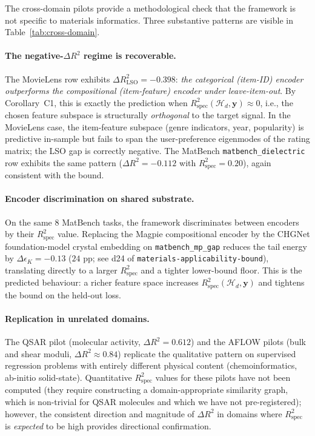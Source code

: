 \documentclass[11pt,a4paper]{article}
\theoremstyle{plain}
\theoremstyle{definition}
\theoremstyle{remark}
\newcommand{\by}{\mathbf{y}}
\newcommand{\Rspec}{R^2_{\mathrm{spec}}}
\newcommand{\Hcal}{\mathcal{H}}
\begin{document}
The cross-domain pilots provide a methodological check that the
framework is not specific to materials informatics.  Three substantive
patterns are visible in Table~\ref{tab:cross-domain}.

\paragraph{The negative-$\Delta R^2$ regime is recoverable.}  The
MovieLens row exhibits $\Delta R^2_{\mathrm{LSO}} = -0.398$:
\emph{the categorical (item-ID) encoder outperforms the
compositional (item-feature) encoder under leave-item-out}.  By
Corollary~C1, this is exactly the prediction when $\Rspec(\Hcal_d,
\by) \approx 0$, i.e., the chosen feature subspace is structurally
\emph{orthogonal} to the target signal.  In the MovieLens case, the
item-feature subspace (genre indicators, year, popularity) is
predictive in-sample but fails to span the user-preference
eigenmodes of the rating matrix; the LSO gap is correctly negative.
The MatBench \texttt{matbench\_dielectric} row exhibits the same
pattern ($\Delta R^2 = -0.112$ with $\Rspec = 0.20$), again
consistent with the bound.

\paragraph{Encoder discrimination on shared substrate.}  On the same
8 MatBench tasks, the framework discriminates between encoders by
their $\Rspec$ value.  Replacing the Magpie compositional encoder by
the CHGNet foundation-model crystal embedding
\citep{Deng2023chgnet} on \texttt{matbench\_mp\_gap} reduces the
tail energy by $\Delta \epsilon_K = -0.13$ ($24$ pp; see d24 of
\texttt{materials-applicability-bound}), translating directly to a
larger $\Rspec$ and a tighter lower-bound floor.  This is the
predicted behaviour: a richer feature space increases $\Rspec(\Hcal_d,
\by)$ and tightens the bound on the held-out loss.

\paragraph{Replication in unrelated domains.}  The QSAR pilot
(molecular activity, $\Delta R^2 = 0.612$) and the AFLOW pilots
(bulk and shear moduli, $\Delta R^2 \approx 0.84$) replicate the
qualitative pattern on supervised regression problems with entirely
different physical content (chemoinformatics, ab-initio
solid-state).  Quantitative $\Rspec$ values for these pilots have
not been computed (they require constructing a domain-appropriate
similarity graph, which is non-trivial for QSAR molecules and
which we have not pre-registered); however, the consistent direction
and magnitude of $\Delta R^2$ in domains where $\Rspec$ is
\emph{expected} to be high provides directional confirmation.
\end{document}
